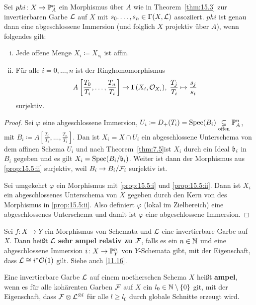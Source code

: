 \begin{prop}
\label{prop:15.5}
	Sei $phi\colon X \to \P^n_A$ ein Morphismus über $A$ wie in Theorem~\ref{thm:15.3} zur invertierbaren Garbe $\mcl$ auf $X$ mit $s_0.\ldots,s_n \in \Gamma(X,\mcl)$ assoziiert. $phi$ ist genau dann eine abgeschlossene Immersion (und folglich $X$ projektiv über $A$), wenn folgendes gilt:
	\begin{enumerate}[i)]
		\item\label{prop:15.5:i} Jede offene Menge $X_i \coloneqq X_{s_i}$ ist affin.
		\item\label{prop:15.5:ii} Für alle $i = 0,\ldots, n$ ist der Ringhomomorphismus
		\[
			A\left[\frac{T_0}{T_i},\ldots,\frac{T_n}{T_i}\right] \to \Gamma(X_i,\mco_{X_i}),\; \frac{T_j}{T_i} \mapsto \frac{s_j}{s_i}
		\]
		surjektiv.
	\end{enumerate}
	\begin{proof}
		Sei $\varphi$ eine abgeschlossene Immersion, $U_i \coloneqq D_+(T_i) =\Spec(B_i)\underset{\text{offen}}{\subseteq}\P^n_A$, mit $B_i \coloneqq A\left[\frac{T_0}{T_i},\ldots,\frac{T_n}{T_i}\right]$. Dan ist $X_i = X \cap U_i$ ein abgeschlossene Unterschema von dem affinen Schema $U_i$ und nach Theorem~\ref{thm:7.5}ist $X_i$ durch ein Ideal $\mfb_i$ in $B_i$ gegeben und es gilt $X_i=\Spec(B_i/\mfb_i)$. Weiter ist dann der Morphismus aus \ref{prop:15.5:ii} surjektiv, weil $B_i \to B_i/\mcf_i$ surjektiv ist.

		Sei umgekehrt $\varphi$ ein Morphismus mit \ref{prop:15.5:i} und \ref{prop:15.5:ii}. Dann ist $X_i$ ein abgeschlossenes Unterschema von $X$ gegeben durch den Kern von des Morphismus in \ref{prop:15.5:ii}. Also definiert $\varphi$ (lokal im Zielbereich) eine abgeschlossenes Unterschema und damit ist $\varphi$ eine abgeschlossene Immersion.
	\end{proof}
\end{prop}

\begin{eri}
\label{eri:15.6}
	Sei $f\colon X \to Y$ ein Morphismus von Schemata und $\mcl$ eine invertierbare Garbe auf $X$. Dann heißt $\mcl$ \textbf{sehr ampel relativ zu $\mcf$}, falls es ein $n \in \N$ und eine abgeschlossene Immersion $i \colon X \to \P^n_Y$ von $Y$-Schemata gibt, mit der Eigenschaft, dass $\mcl \cong i^*\mco(1)$ gilt. Siehe auch \ref{11.16}.
\end{eri}

\begin{defn}
\label{defn:15.6}
	Eine invertierbare Garbe $\mcl$ auf einem noetherschen Schema $X$ heißt \textbf{ampel}, wenn es für alle kohärenten Garben $\mcf$ auf $X$ ein $l_0 \in \N \setminus \{0\}$ git, mit der Eigenschaft, dass $\mcf \otimes \mcl^{\otimes l}$ für alle $l \ge l_0$ durch globale Schnitte erzeugt wird.
\end{defn}

